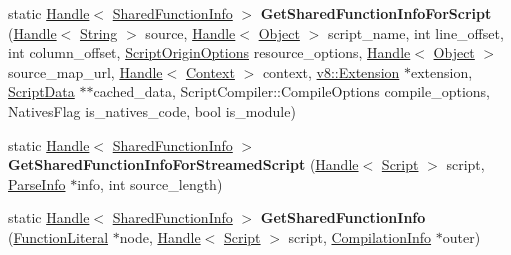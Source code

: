 \begin{DoxyCompactItemize}
\item 
static \hyperlink{classv8_1_1internal_1_1_handle}{Handle}$<$ \hyperlink{classv8_1_1internal_1_1_shared_function_info}{Shared\+Function\+Info} $>$ {\bfseries Get\+Shared\+Function\+Info\+For\+Script} (\hyperlink{classv8_1_1internal_1_1_handle}{Handle}$<$ \hyperlink{classv8_1_1internal_1_1_string}{String} $>$ source, \hyperlink{classv8_1_1internal_1_1_handle}{Handle}$<$ \hyperlink{classv8_1_1internal_1_1_object}{Object} $>$ script\+\_\+name, int line\+\_\+offset, int column\+\_\+offset, \hyperlink{classv8_1_1_script_origin_options}{Script\+Origin\+Options} resource\+\_\+options, \hyperlink{classv8_1_1internal_1_1_handle}{Handle}$<$ \hyperlink{classv8_1_1internal_1_1_object}{Object} $>$ source\+\_\+map\+\_\+url, \hyperlink{classv8_1_1internal_1_1_handle}{Handle}$<$ \hyperlink{classv8_1_1internal_1_1_context}{Context} $>$ context, \hyperlink{classv8_1_1_extension}{v8\+::\+Extension} $\ast$extension, \hyperlink{classv8_1_1internal_1_1_script_data}{Script\+Data} $\ast$$\ast$cached\+\_\+data, Script\+Compiler\+::\+Compile\+Options compile\+\_\+options, Natives\+Flag is\+\_\+natives\+\_\+code, bool is\+\_\+module)\hypertarget{classv8_1_1internal_1_1_compiler_a25e6b099527639ab8b35a85461e1343f}{}\label{classv8_1_1internal_1_1_compiler_a25e6b099527639ab8b35a85461e1343f}

\item 
static \hyperlink{classv8_1_1internal_1_1_handle}{Handle}$<$ \hyperlink{classv8_1_1internal_1_1_shared_function_info}{Shared\+Function\+Info} $>$ {\bfseries Get\+Shared\+Function\+Info\+For\+Streamed\+Script} (\hyperlink{classv8_1_1internal_1_1_handle}{Handle}$<$ \hyperlink{classv8_1_1internal_1_1_script}{Script} $>$ script, \hyperlink{classv8_1_1internal_1_1_parse_info}{Parse\+Info} $\ast$info, int source\+\_\+length)\hypertarget{classv8_1_1internal_1_1_compiler_a033011b6f9ed6b83223990cc132ec5ba}{}\label{classv8_1_1internal_1_1_compiler_a033011b6f9ed6b83223990cc132ec5ba}

\item 
static \hyperlink{classv8_1_1internal_1_1_handle}{Handle}$<$ \hyperlink{classv8_1_1internal_1_1_shared_function_info}{Shared\+Function\+Info} $>$ {\bfseries Get\+Shared\+Function\+Info} (\hyperlink{classv8_1_1internal_1_1_function_literal}{Function\+Literal} $\ast$node, \hyperlink{classv8_1_1internal_1_1_handle}{Handle}$<$ \hyperlink{classv8_1_1internal_1_1_script}{Script} $>$ script, \hyperlink{classv8_1_1internal_1_1_compilation_info}{Compilation\+Info} $\ast$outer)\hypertarget{classv8_1_1internal_1_1_compiler_a3de24bea8aade6a4eb6a8b95f97541ca}{}\label{classv8_1_1internal_1_1_compiler_a3de24bea8aade6a4eb6a8b95f97541ca}


\end{DoxyCompactItemize}
